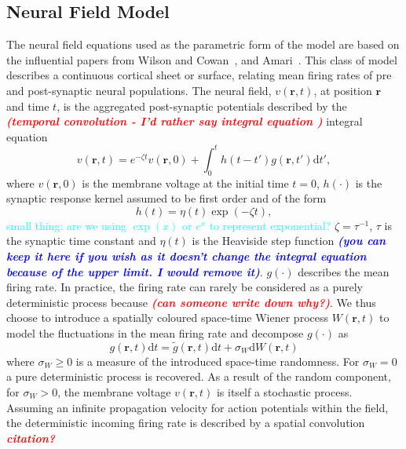 \documentclass[]{article}
\newcommand{\dean}[1]{\textsf{\emph{\textbf{\textcolor{red}{#1}}}}}
\newcommand{\parham}[1]{\textsf{\emph{\textbf{\textcolor{blue}{#1}}}}}
\newcommand{\cyan}{\textcolor{cyan}}
\begin{document}
\subsection{Neural Field Model}
The neural field equations used as the parametric form of the model are based on the influential papers from Wilson and Cowan~\cite{Wilson1973}, and Amari~\cite{Amari1977}. This class of model describes a continuous cortical sheet or surface, relating mean firing rates of pre and post-synaptic neural populations. The neural field, $v\left( {\mathbf{r},t} \right)$, at position $\mathbf{r}$ and time $t$, is the aggregated post-synaptic potentials described by the \dean{(temporal convolution - I'd rather say integral equation	)} integral equation 
\begin{equation}
	\label{SpikesToPotential} v\left( {\mathbf{r},t} \right) = e^{-\zeta t}v\left( {\mathbf{r},0} \right) + \int_{0}^t {h\left( {t - t'} \right)g\left( {\mathbf{r},t'} \right)\textrm{d}t'}, 
\end{equation}   
where $v\left( {\mathbf{r},0} \right)$ is the membrane voltage at the initial time $t = 0$, $h(\cdot)$ is the synaptic response kernel assumed to be first order and of the form 
\begin{equation}
	\label{SynapticRespKernel} h(t) = \eta(t)\exp{\left(-\zeta t\right)}, 
\end{equation}
\cyan{small thing: are we using $\exp(x)$ or $e^x$ to represent exponential?}
$\zeta=\tau^{-1}$, $\tau$ is the synaptic time constant and $\eta(t)$ is the Heaviside step function \parham{(you can keep it here if you wish as it doesn't change the integral equation because of the upper limit. I would remove it)}. $g(\cdot)$ describes the mean firing rate. In practice, the firing rate can rarely be considered as a purely deterministic process because \dean{(can someone write down why?)}. We thus choose to introduce a spatially coloured space-time Wiener process $W(\mathbf{r},t)$ to model the fluctuations in the mean firing rate and decompose $g(\cdot)$ as
\begin{equation}\label{DecompositionOfg}
g(\mathbf{r},t)\textrm{d}t = \tilde{g}(\mathbf{r},t)\textrm{d}t + \sigma_W \textrm{d}W(\mathbf{r},t) 
\end{equation}
where $\sigma_W \ge 0$ is a measure of the introduced space-time randomness. For $\sigma_W = 0$ a pure deterministic process is recovered. As a result of the random component, for $\sigma_W > 0$, the membrane voltage $v(\mathbf{r},t)$ is itself a stochastic process. Assuming an infinite propagation velocity for action potentials within the field, the deterministic incoming firing rate is described by a spatial convolution \dean{citation?}
\end{document}
